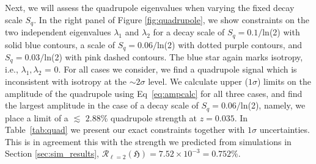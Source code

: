 \documentclass[fleqn,usenatbib]{mnras}
\begin{document}
{Next, we will assess the quadrupole eigenvalues when varying the fixed decay scale $S_q$.}
{In the} right panel of Figure \ref{fig:quadrupole}, {we show constraints on the two independent eigenvalues $\lambda_1$ and $\lambda_2$ for} 
a decay scale of $S_q=0.1/$ln(2) {with solid blue contours}, {a scale of} $S_q=0.06/$ln(2) with dotted purple contours, and $S_q=0.03/$ln(2) {with pink dashed contours}. The blue star again marks isotropy, i.e., $\lambda_1, \lambda_2$ = 0. 
For all cases {we consider}, we find a {quadrupole} signal {which is} inconsistent with isotropy at the $\sim 2\sigma$ level. {We calculate upper {($1\sigma$)} limits on the amplitude of the quadrupole{ using Eq~\ref{eq:ampcalc}} for all three cases, {and find
the largest amplitude %
{in the case of a decay} scale of $S_q=0.06/$ln(2), %
{namely, we place a limit of a $\lesssim$ { $2.88\%$} quadrupole strength at $z=0.035$.
In Table~\ref{tab:quad} we present our exact constraints together} with $1\sigma$ uncertainties.}} This is in agreement this with the strength we predicted from simulations in Section \ref{sec:sim_results}, {$\mathcal{R}_{\ell=2}(\mathfrak{H}) = 7.52 \times 10^{-3} = 0.752 \%$. }  
\end{document}
